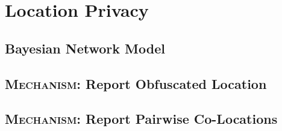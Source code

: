 \documentclass{report}
\begin{document}
	\section{Location Privacy}
	\startsection
		\renewcommand{\thesubsection}{\thesection.\alph{subsection}}
		\subsection{Bayesian Network Model}
		\startsubsection
		\closesection
		\subsection{\textsc{Mechanism}: Report Obfuscated Location}
		\startsubsection
		\closesection
		\subsection{\textsc{Mechanism}: Report Pairwise Co-Locations}
		\startsubsection
		\closesection
	\closesection
\end{document}
